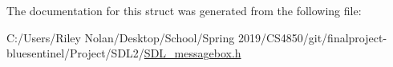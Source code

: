 The documentation for this struct was generated from the following file\+:\begin{DoxyCompactItemize}
\item 
C\+:/\+Users/\+Riley Nolan/\+Desktop/\+School/\+Spring 2019/\+C\+S4850/git/finalproject-\/bluesentinel/\+Project/\+S\+D\+L2/\mbox{\hyperlink{_s_d_l__messagebox_8h}{S\+D\+L\+\_\+messagebox.\+h}}\end{DoxyCompactItemize}
